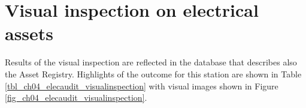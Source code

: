 %
\section{Visual inspection on electrical assets} \label{ch04_elecaudit_visualinspection}
Results of the visual inspection are reflected in the database that describes also the Asset Registry. Highlights of the outcome for this station are shown in Table \ref{tbl_ch04_elecaudit_visualinspection} with visual images shown in Figure \ref{fig_ch04_elecaudit_visualinspection}.





